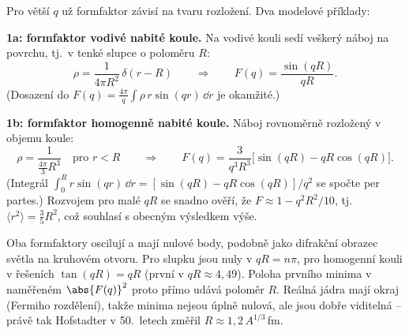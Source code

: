 Pro větší \(q\) už formfaktor závisí na tvaru rozložení. Dva modelové
příklady:

\textbf{1a: formfaktor vodivé nabité koule.} Na vodivé kouli sedí veškerý
náboj na povrchu, tj.\ v tenké slupce o poloměru \(R\):
\[
  \rho = \frac{1}{4\pi R^2}\,\delta(r-R)
  \qquad\Rightarrow\qquad
  F(q) = \frac{\sin(qR)}{qR} .
\]
(Dosazení do \(F(q)=\frac{4\pi}{q}\int\rho\,r\sin(qr)\,\dd r\) je
okamžité.)

\textbf{1b: formfaktor homogenně nabité koule.} Náboj rovnoměrně rozložený
v objemu koule:
\[
  \rho = \frac{1}{\frac{4\pi}{3}R^3}\quad\text{pro } r<R
  \qquad\Rightarrow\qquad
  F(q) = \frac{3}{q^3R^3}\Big[\sin(qR) - qR\cos(qR)\Big] .
\]
(Integrál \(\int_0^R r\sin(qr)\,\dd r = [\sin(qR)-qR\cos(qR)]/q^2\) se spočte
per partes.) Rozvojem pro malé \(qR\) se snadno ověří, že
\(F\approx 1 - q^2R^2/10\), tj.\ \(\langle r^2\rangle = \frac35R^2\), což
souhlasí s obecným výsledkem výše.

\begin{vysvetleni}
Oba formfaktory oscilují a mají nulové body, podobně jako difrakční obrazec
světla na kruhovém otvoru. Pro slupku jsou nuly v \(qR=n\pi\), pro homogenní
kouli v řešeních \(\tan(qR)=qR\) (první v \(qR\approx4{,}49\)). Poloha
prvního minima v naměřeném \(\abs{F(q)}^2\) proto přímo udává poloměr
\(R\). Reálná jádra mají  okraj (Fermiho rozdělení), takže
minima nejsou úplně nulová, ale jsou dobře viditelná -- právě tak Hofstadter
v 50.~letech změřil \(R\approx1{,}2\,A^{1/3}\)\,fm.
\begin{center}
\end{center}
\end{vysvetleni}

